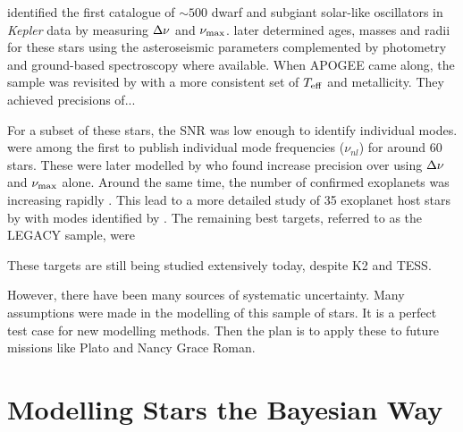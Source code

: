\citet{Chaplin.Kjeldsen.ea2011} identified the first catalogue of \(\sim 500\) dwarf and subgiant solar-like oscillators in \emph{Kepler} data by measuring \({\Delta\nu}\) and \({\nu_\mathrm{max}}\). \citet{Chaplin.Basu.ea2014} later determined ages, masses and radii for these stars using the asteroseismic parameters complemented by photometry and ground-based spectroscopy where available. When APOGEE came along, the sample was revisited by \citet{Serenelli.Johnson.ea2017} with a more consistent set of \({T_\mathrm{eff}}\) and metallicity. They achieved precisions of...

For a subset of these stars, the SNR was low enough to identify individual modes. \citet{Appourchaux.Chaplin.ea2012} were among the first to publish individual mode frequencies (\(\nu_{nl}\)) for around 60 stars. These were later modelled by \citet{Metcalfe.Creevey.ea2014} who found increase precision over using \({\Delta\nu}\) and \({\nu_\mathrm{max}}\) alone. Around the same time, the number of confirmed exoplanets was increasing rapidly \needcite. This lead to a more detailed study of 35 exoplanet host stars by \citet{SilvaAguirre.Davies.ea2015} with modes identified by \citet{Davies.Aguirre.ea2016}. The remaining best targets, referred to as the LEGACY sample, were \citet{Lund.SilvaAguirre.ea2017} \citet{SilvaAguirre.Lund.ea2017}

These targets are still being studied extensively today, despite K2 and TESS.

However, there have been many sources of systematic uncertainty. Many assumptions were made in the modelling of this sample of stars. It is a perfect test case for new modelling methods. Then the plan is to apply these to future missions like Plato and Nancy Grace Roman.

\section{Modelling Stars the Bayesian Way}\label{sec:modelling-stars}


